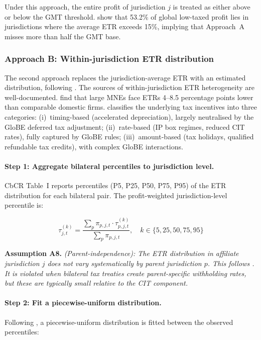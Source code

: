 \documentclass[11pt,a4paper]{article}
\newcommand{\assumption}[2]{\noindent\textbf{Assumption #1.} \textit{#2}\medskip}
\begin{document}
Under this approach, the entire profit of jurisdiction $j$ is treated as either above or below the GMT threshold. \citet{hugger2026} show that 53.2\% of global low-taxed profit lies in jurisdictions where the average ETR exceeds 15\%, implying that Approach~A misses more than half the GMT base.

\subsubsection{Approach B: Within-jurisdiction ETR distribution}\label{sec:approach_b}

The second approach replaces the jurisdiction-average ETR with an estimated distribution, following \citet{hugger2026}. The sources of within-jurisdiction ETR heterogeneity are well-documented. \citet{johansson2017} find that large MNEs face ETRs 4--8.5 percentage points lower than comparable domestic firms. \citet{ferreiraliotti2022} classifies the underlying tax incentives into three categories: (i)~timing-based (accelerated depreciation), largely neutralised by the GloBE deferred tax adjustment; (ii)~rate-based (IP box regimes, reduced CIT rates), fully captured by GloBE rules; (iii)~amount-based (tax holidays, qualified refundable tax credits), with complex GloBE interactions.

\paragraph{Step 1: Aggregate bilateral percentiles to jurisdiction level.}
CbCR Table~I reports percentiles (P5, P25, P50, P75, P95) of the ETR distribution for each bilateral pair. The profit-weighted jurisdiction-level percentile is:

\begin{equation}\label{eq:jurisdiction_percentile}
\tau_{j,t}^{(k)} = \frac{\sum_p \pi_{p,j,t} \cdot \tau_{p,j,t}^{(k)}}{\sum_p \pi_{p,j,t}}, \quad k \in \{5, 25, 50, 75, 95\}
\end{equation}

\assumption{A8}{(Parent-independence): The ETR distribution in affiliate jurisdiction $j$ does not vary systematically by parent jurisdiction $p$. This follows \citet{hugger2026}. It is violated when bilateral tax treaties create parent-specific withholding rates, but these are typically small relative to the CIT component.}

\paragraph{Step 2: Fit a piecewise-uniform distribution.}
Following \citet{hugger2026}, a piecewise-uniform distribution is fitted between the observed percentiles:
\end{document}
